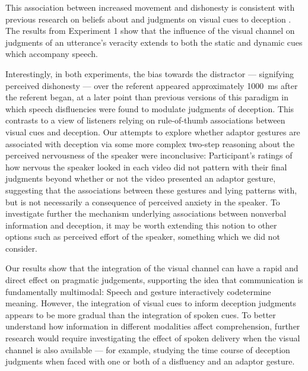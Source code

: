 \documentclass[a4paper,man,natbib]{apa6}
\begin{document}
This association between increased movement and dishonesty is consistent with previous research on beliefs about and judgments on visual cues to deception \citep{Zuckerman1981}.
The results from Experiment 1 show that the influence of the visual channel on judgments of an utterance's veracity extends to both the static and dynamic cues which accompany speech.

Interestingly, in both experiments, the bias towards the distractor --- signifying perceived dishonesty --- over the referent appeared approximately 1000~ms after the referent began, at a later point than previous versions of this paradigm in which speech disfluencies were found to modulate judgments of deception. 
This contrasts to a view of listeners relying on rule-of-thumb associations between visual cues and deception.
Our attempts to explore whether adaptor gestures are associated with deception via some more complex two-step reasoning about the perceived nervousness of the speaker were inconclusive: Participant's ratings of how nervous the speaker looked in each video did not pattern with their final judgments beyond whether or not the video presented an adaptor gesture, suggesting that the associations between these gestures and lying patterns with, but is not necessarily a consequence of perceived anxiety in the speaker.
To investigate further the mechanism underlying associations between nonverbal information and deception, it may be worth extending this notion to other options such as perceived effort of the speaker, something which we did not consider.%

Our results show that the integration of the visual channel can have a rapid and direct effect on pragmatic judgements, supporting the idea that communication is fundamentally multimodal: 
Speech and gesture interactively codetermine meaning.
However, the integration of visual cues to inform deception judgments appears to be more gradual than the integration of spoken cues.
To better understand how information in different modalities affect comprehension, further research would require investigating the effect of spoken delivery when the visual channel is also available --- for example, studying the time course of deception judgments when faced with one or both of a disfluency and an adaptor gesture.


\end{document}

